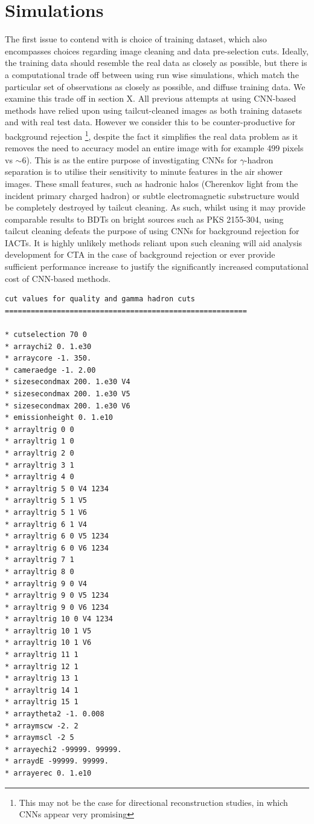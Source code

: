 \section{Simulations}
The first issue to contend with is choice of training dataset, which also encompasses choices regarding image cleaning and data pre-selection cuts. Ideally, the training data should resemble the real data as closely as possible, but there is a computational trade off between using run wise simulations, which match the particular set of observations as closely as possible, and diffuse training data. We examine this trade off in section X. All previous attempts at using CNN-based methods have relied upon using tailcut-cleaned images \cite{Shilon} as both training datasets and with real test data. However we consider this to be counter-productive for background rejection \footnote{This may not be the case for directional reconstruction studies, in which CNNs appear very promising}, despite the fact it simplifies the real data problem as it removes the need to accuracy model an entire image with for example 499 pixels vs $\sim$6). This is as the entire purpose of investigating CNNs for $\gamma$-hadron separation is to utilise their sensitivity to minute features in the air shower images. These small features, such as hadronic halos \cite{model++}(Cherenkov light from the incident primary charged hadron) or subtle electromagnetic substructure would be completely destroyed by tailcut cleaning. As such, whilst using it may provide comparable results to BDTs on bright sources such as PKS 2155-304, using tailcut cleaning defeats the purpose of using CNNs for background rejection for IACTs. It is highly unlikely methods reliant upon such cleaning will aid analysis development for CTA in the case of background rejection or ever provide sufficient performance increase to justify the significantly increased computational cost of CNN-based methods.

\begin{lstlisting}[label=verb1,caption=Cut Description Used for the Real Data Analysis in Eventdisplay format,float,frame=tb]
cut values for quality and gamma hadron cuts
========================================================

* cutselection 70 0
* arraychi2 0. 1.e30
* arraycore -1. 350.
* cameraedge -1. 2.00
* sizesecondmax 200. 1.e30 V4
* sizesecondmax 200. 1.e30 V5
* sizesecondmax 200. 1.e30 V6
* emissionheight 0. 1.e10
* arrayltrig 0 0
* arrayltrig 1 0
* arrayltrig 2 0
* arrayltrig 3 1
* arrayltrig 4 0
* arrayltrig 5 0 V4 1234
* arrayltrig 5 1 V5
* arrayltrig 5 1 V6
* arrayltrig 6 1 V4
* arrayltrig 6 0 V5 1234
* arrayltrig 6 0 V6 1234
* arrayltrig 7 1
* arrayltrig 8 0
* arrayltrig 9 0 V4
* arrayltrig 9 0 V5 1234
* arrayltrig 9 0 V6 1234
* arrayltrig 10 0 V4 1234
* arrayltrig 10 1 V5
* arrayltrig 10 1 V6
* arrayltrig 11 1
* arrayltrig 12 1
* arrayltrig 13 1
* arrayltrig 14 1
* arrayltrig 15 1
* arraytheta2 -1. 0.008
* arraymscw -2. 2
* arraymscl -2 5
* arrayechi2 -99999. 99999.
* arraydE -99999. 99999.
* arrayerec 0. 1.e10
\end{lstlisting}


